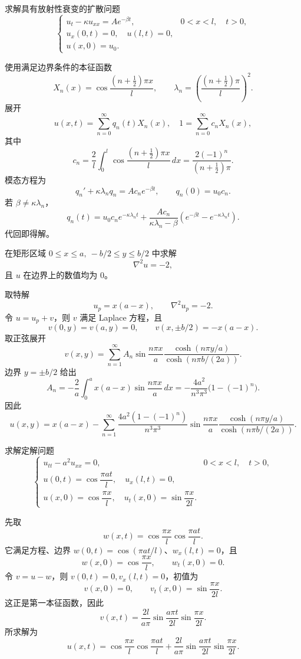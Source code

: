 \begin{question}
求解具有放射性衰变的扩散问题
\[
\begin{cases}
u_t-\kappa u_{xx}=Ae^{-\beta t},&0<x<l,
\quad t>0,\\
u_x(0,t)=0,
\quad u(l,t)=0,\\
u(x,0)=u_0.
\end{cases}
\]
\begin{solution}
使用满足边界条件的本征函数
\[
X_n(x)=\cos\frac{(n+\frac12)\pi x}{l},
\qquad
\lambda_n=\left(\frac{(n+\frac12)\pi}{l}\right)^2.
\]
展开
\[
u(x,t)=\sum_{n=0}^{\infty}q_n(t)X_n(x),
\quad
1=\sum_{n=0}^{\infty}c_nX_n(x),
\]
其中
\[
c_n=\frac2l\int_0^l\cos\frac{(n+\frac12)\pi x}{l}\,dx
=\frac{2(-1)^n}{(n+\frac12)\pi}.
\]
模态方程为
\[
q_n'+\kappa\lambda_nq_n=Ac_ne^{-\beta t},
\qquad q_n(0)=u_0c_n.
\]
若 \(\beta\ne\kappa\lambda_n\)，
\[
q_n(t)=u_0c_ne^{-\kappa\lambda_nt}
+\frac{Ac_n}{\kappa\lambda_n-\beta}
\left(e^{-\beta t}-e^{-\kappa\lambda_nt}\right).
\]
代回即得解。
\end{solution}
\end{question}

\begin{question}
在矩形区域 \(0\le x\le a,\ -b/2\le y\le b/2\) 中求解
\[
\nabla^2u=-2,
\]
且 \(u\) 在边界上的数值均为 \(0\)。
\begin{solution}
取特解
\[
u_p=x(a-x),
\qquad \nabla^2u_p=-2.
\]
令 \(u=u_p+v\)，则 \(v\) 满足 Laplace 方程，且
\[
v(0,y)=v(a,y)=0,
\qquad
v(x,\pm b/2)=-x(a-x).
\]
取正弦展开
\[
v(x,y)=\sum_{n=1}^{\infty}A_n
\sin\frac{n\pi x}{a}
\frac{\cosh(n\pi y/a)}{\cosh(n\pi b/(2a))}.
\]
边界 \(y=\pm b/2\) 给出
\[
A_n=-\frac2a\int_0^a x(a-x)\sin\frac{n\pi x}{a}\,dx
=-\frac{4a^2}{n^3\pi^3}\bigl(1-(-1)^n\bigr).
\]
因此
\[
u(x,y)=x(a-x)-\sum_{n=1}^{\infty}
\frac{4a^2(1-(-1)^n)}{n^3\pi^3}
\sin\frac{n\pi x}{a}
\frac{\cosh(n\pi y/a)}{\cosh(n\pi b/(2a))}.
\]
\end{solution}
\end{question}

\begin{question}
求解定解问题
\[
\begin{cases}
u_{tt}-a^2u_{xx}=0,&0<x<l,
\quad t>0,\\
u(0,t)=\cos\dfrac{\pi at}{l},
\quad u_x(l,t)=0,\\
u(x,0)=\cos\dfrac{\pi x}{l},
\quad u_t(x,0)=\sin\dfrac{\pi x}{2l}.
\end{cases}
\]
\begin{solution}
先取
\[
w(x,t)=\cos\frac{\pi x}{l}\cos\frac{\pi at}{l}.
\]
它满足方程、边界 \(w(0,t)=\cos(\pi at/l)\)、\(w_x(l,t)=0\)，且
\[
w(x,0)=\cos\frac{\pi x}{l},\qquad w_t(x,0)=0.
\]
令 \(v=u-w\)，则 \(v(0,t)=0,
 v_x(l,t)=0\)，初值为
\[
v(x,0)=0,
\qquad v_t(x,0)=\sin\frac{\pi x}{2l}.
\]
这正是第一本征函数，因此
\[
v(x,t)=\frac{2l}{a\pi}
\sin\frac{a\pi t}{2l}
\sin\frac{\pi x}{2l}.
\]
所求解为
\[
u(x,t)=\cos\frac{\pi x}{l}\cos\frac{\pi at}{l}
+\frac{2l}{a\pi}\sin\frac{a\pi t}{2l}\sin\frac{\pi x}{2l}.
\]
\end{solution}
\end{question}

